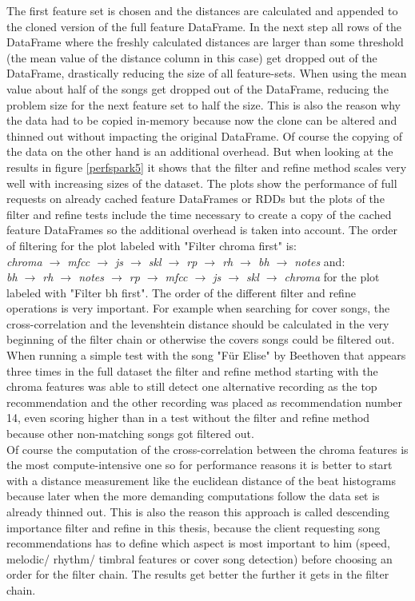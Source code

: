 \noindent The first feature set is chosen and the distances are calculated and appended to the cloned version of the full feature DataFrame. 
In the next step all rows of the DataFrame where the freshly calculated distances are larger than some threshold (the mean value of the distance column in this case) get dropped out of the DataFrame, drastically reducing the size of all feature-sets.
When using the mean value about half of the songs get dropped out of the DataFrame, reducing the problem size for the next feature set to half the size. This is also the reason why the data had to be copied in-memory because now the clone can be altered and thinned out without impacting the original DataFrame. Of course the copying of the data on the other hand is an additional overhead. 
But when looking at the results in figure \ref{perfspark5} it shows that the filter and refine method scales very well with increasing sizes of the dataset. The plots show the performance of full requests on already cached feature DataFrames or RDDs but the plots of the filter and refine tests include the time necessary to create a copy of the cached feature DataFrames so the additional overhead is taken into account. 
\noindent The order of filtering for the plot labeled with "Filter chroma first" is:\\
\textit{chroma $\rightarrow$ mfcc  $\rightarrow$ js  $\rightarrow$ skl $\rightarrow$ rp  $\rightarrow$ rh  $\rightarrow$ bh  $\rightarrow$ notes} and:\\
\textit{bh $\rightarrow$ rh $\rightarrow$ notes $\rightarrow$ rp $\rightarrow$ mfcc $\rightarrow$ js $\rightarrow$ skl $\rightarrow$ chroma} for the plot labeled with "Filter bh first".
\noindent The order of the different filter and refine operations is very important. For example when searching for cover songs, the cross-correlation and the levenshtein distance should be calculated in the very beginning of the filter chain or otherwise the covers songs could be filtered out. When running a simple test with the song "Für Elise" by Beethoven that appears three times in the full dataset the filter and refine method starting with the chroma features was able to still detect one alternative recording as the top recommendation and the other recording was placed as recommendation number 14, even scoring higher than in a test without the filter and refine method because other non-matching songs got filtered out.\\
Of course the computation of the cross-correlation between the chroma features is the most compute-intensive one so for performance reasons it is better to start with a distance measurement like the euclidean distance of the beat histograms because later when the more demanding computations follow the data set is already thinned out. 
This is also the reason this approach is called descending importance filter and refine in this thesis, because the client requesting song recommendations has to define which aspect is most important to him (speed, melodic/ rhythm/ timbral features or cover song detection) before choosing an order for the filter chain. The results get better the further it gets in the filter chain.  

